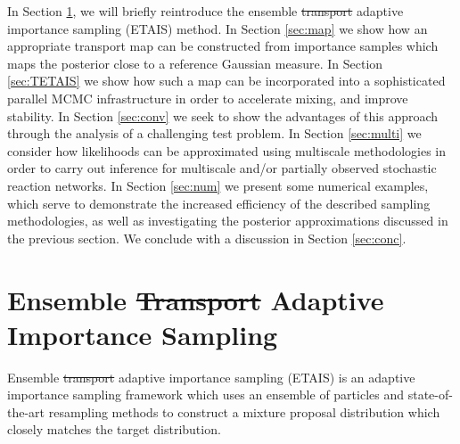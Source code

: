 \documentclass[final]{siamltex}
\providecommand{\DIFadd}[1]{{\protect\color{blue}\uwave{#1}}} %
\providecommand{\DIFdel}[1]{{\protect\color{red}\sout{#1}}}                      %
\providecommand{\DIFaddbegin}{} %
\providecommand{\DIFaddend}{} %
\providecommand{\DIFdelbegin}{} %
\providecommand{\DIFdelend}{} %
\newcommand{\DIFscaledelfig}{0.5}
\newlength{\DIFdelgraphicswidth} %
\newlength{\DIFdelgraphicsheight} %
\newcommand{\DIFaddincludegraphics}[2][]{{\color{blue}\fbox{\DIFOincludegraphics[#1]{#2}}}} %
\newcommand{\DIFdelincludegraphics}[2][]{%
\sbox{\DIFdelgraphicsbox}{\DIFOincludegraphics[#1]{#2}}%
\settoboxwidth{\DIFdelgraphicswidth}{\DIFdelgraphicsbox} %
\settoboxtotalheight{\DIFdelgraphicsheight}{\DIFdelgraphicsbox} %
\scalebox{\DIFscaledelfig}{%
\parbox[b]{\DIFdelgraphicswidth}{\usebox{\DIFdelgraphicsbox}\\[-\baselineskip] \rule{\DIFdelgraphicswidth}{0em}}\llap{\resizebox{\DIFdelgraphicswidth}{\DIFdelgraphicsheight}{%
\setlength{\unitlength}{\DIFdelgraphicswidth}%
\begin{picture}(1,1)%
\thicklines\linethickness{2pt} %
{\color[rgb]{1,0,0}\put(0,0){\framebox(1,1){}}}%
{\color[rgb]{1,0,0}\put(0,0){\line( 1,1){1}}}%
{\color[rgb]{1,0,0}\put(0,1){\line(1,-1){1}}}%
\end{picture}%
}\hspace*{3pt}}} %
} %
\DeclareRobustCommand{\DIFaddbegin}{\DIFOaddbegin \let\includegraphics\DIFaddincludegraphics} %
\DeclareRobustCommand{\DIFaddend}{\DIFOaddend \let\includegraphics\DIFOincludegraphics} %
\DeclareRobustCommand{\DIFdelbegin}{\DIFOdelbegin \let\includegraphics\DIFdelincludegraphics} %
\DeclareRobustCommand{\DIFdelend}{\DIFOaddend \let\includegraphics\DIFOincludegraphics} %
\begin{document}

In Section \ref{sec:ETAIS}, we will briefly reintroduce the ensemble
\DIFdelbegin \DIFdel{transport }\DIFdelend \DIFaddbegin \DIFadd{transform }\DIFaddend adaptive importance sampling (ETAIS) method. In Section \ref{sec:map} we show how an appropriate transport map can
be constructed from importance samples which maps the posterior close
to a reference Gaussian measure. In Section \ref{sec:TETAIS} we show
how such a map can be incorporated into a sophisticated parallel MCMC
infrastructure in order to accelerate mixing, and improve stability. In Section
\ref{sec:conv} we seek to show the advantages of this approach through
the analysis of a challenging test problem. In Section
\ref{sec:multi} we consider how likelihoods can be approximated using
 multiscale methodologies in order to carry out inference for
multiscale and/or partially observed stochastic reaction networks. In
Section \ref{sec:num} we present some numerical examples, which serve
to demonstrate the increased efficiency of the described sampling
methodologies, as well as investigating the posterior approximations
discussed in the previous section. We conclude with a discussion in
Section \ref{sec:conc}.

\section{Ensemble \DIFdelbegin \DIFdel{Transport }\DIFdelend \DIFaddbegin \DIFadd{Transform }\DIFaddend Adaptive Importance Sampling}\label{sec:ETAIS}
Ensemble \DIFdelbegin \DIFdel{transport }\DIFdelend \DIFaddbegin \DIFadd{transform }\DIFaddend adaptive importance sampling
(ETAIS)\cite{cotter2015parallel} is an adaptive importance sampling framework
which uses an ensemble of particles and state-of-the-art resampling
methods to construct a mixture proposal distribution which closely
matches the target distribution. 
\end{document}

